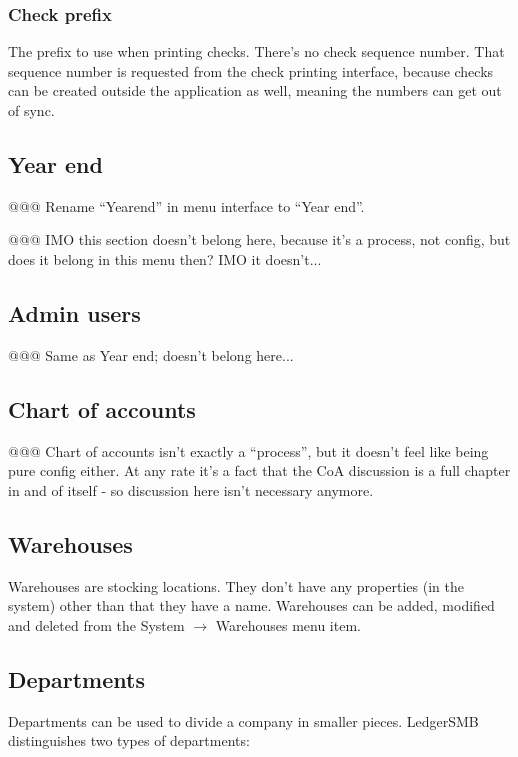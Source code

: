 \subsubsection{Check prefix} The prefix to use when printing checks. There's no check sequence number. That sequence number is requested from the check printing interface, because
checks can be created outside the application as well, meaning the numbers can
get out of sync.

\subsection{Year end}

@@@ Rename ``Yearend'' in menu interface to ``Year end''.


@@@ IMO this section doesn't belong here, because it's a process, not config, but does it belong in this menu then? IMO it doesn't...


\subsection{Admin users}

@@@ Same as Year end; doesn't belong here...

\subsection{Chart of accounts}

@@@ Chart of accounts isn't exactly a ``process'', but it doesn't feel like being pure
config either. At any rate it's a fact that the CoA discussion is a full chapter in and
of itself - so discussion here isn't necessary anymore.

\subsection{Warehouses}

Warehouses are stocking locations. They don't have any properties (in the system)
other than that they have a name. Warehouses can be added, modified and deleted from
the System $\rightarrow$ Warehouses menu item.

\subsection{Departments}

Departments can be used to divide a company in smaller pieces. LedgerSMB distinguishes two
types of departments:


